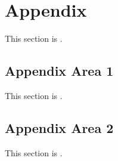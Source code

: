 
\chapter{Appendix}
\label{loc:AppendixA}
% 

This section is \TBD.

\section{Appendix Area 1}
\label{loc:Appendix_1}
% 

This section is \TBD.

\section{Appendix Area 2}
\label{loc:Appendix_2}
% 

This section is \TBD.
